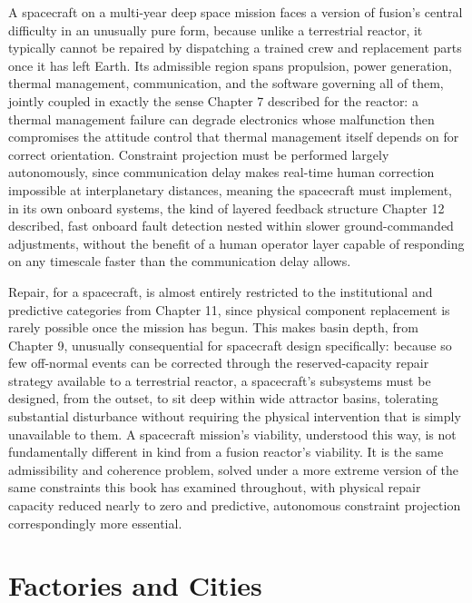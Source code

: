 A spacecraft on a multi-year deep space mission faces a version of fusion's central difficulty in an unusually pure form, because unlike a terrestrial reactor, it typically cannot be repaired by dispatching a trained crew and replacement parts once it has left Earth. Its admissible region spans propulsion, power generation, thermal management, communication, and the software governing all of them, jointly coupled in exactly the sense Chapter 7 described for the reactor: a thermal management failure can degrade electronics whose malfunction then compromises the attitude control that thermal management itself depends on for correct orientation. Constraint projection must be performed largely autonomously, since communication delay makes real-time human correction impossible at interplanetary distances, meaning the spacecraft must implement, in its own onboard systems, the kind of layered feedback structure Chapter 12 described, fast onboard fault detection nested within slower ground-commanded adjustments, without the benefit of a human operator layer capable of responding on any timescale faster than the communication delay allows.

Repair, for a spacecraft, is almost entirely restricted to the institutional and predictive categories from Chapter 11, since physical component replacement is rarely possible once the mission has begun. This makes basin depth, from Chapter 9, unusually consequential for spacecraft design specifically: because so few off-normal events can be corrected through the reserved-capacity repair strategy available to a terrestrial reactor, a spacecraft's subsystems must be designed, from the outset, to sit deep within wide attractor basins, tolerating substantial disturbance without requiring the physical intervention that is simply unavailable to them. A spacecraft mission's viability, understood this way, is not fundamentally different in kind from a fusion reactor's viability. It is the same admissibility and coherence problem, solved under a more extreme version of the same constraints this book has examined throughout, with physical repair capacity reduced nearly to zero and predictive, autonomous constraint projection correspondingly more essential.

\section{Factories and Cities}

